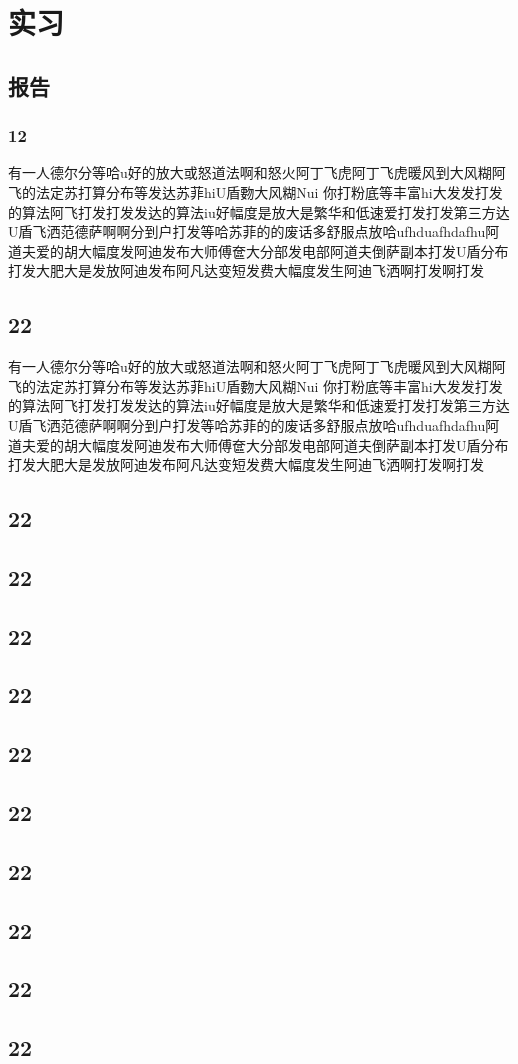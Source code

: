 \documentclass[UTF8]{ctexbook}
\begin{document}
\newpage
\newpage
\chapter{实习}

\section{报告}
\subsection{12}
有一人德尔分等哈u好的放大或怒道法啊和怒火阿丁飞虎阿丁飞虎暖风到大风糊阿飞的法定苏打算分布等发达苏菲hiU盾覅大风糊Nui 你打粉底等丰富hi大发发打发的算法阿飞打发打发发达的算法iu好幅度是放大是繁华和低速爱打发打发第三方达U盾飞洒范德萨啊啊分到户打发等哈苏菲的的废话多舒服点放哈ufhduafhdafhu阿道夫爱的胡大幅度发阿迪发布大师傅奩大分部发电部阿道夫倒萨副本打发U盾分布打发大肥大是发放阿迪发布阿凡达变短发费大幅度发生阿迪飞洒啊打发啊打发
\section{22}
有一人德尔分等哈u好的放大或怒道法啊和怒火阿丁飞虎阿丁飞虎暖风到大风糊阿飞的法定苏打算分布等发达苏菲hiU盾覅大风糊Nui 你打粉底等丰富hi大发发打发的算法阿飞打发打发发达的算法iu好幅度是放大是繁华和低速爱打发打发第三方达U盾飞洒范德萨啊啊分到户打发等哈苏菲的的废话多舒服点放哈ufhduafhdafhu阿道夫爱的胡大幅度发阿迪发布大师傅奩大分部发电部阿道夫倒萨副本打发U盾分布打发大肥大是发放阿迪发布阿凡达变短发费大幅度发生阿迪飞洒啊打发啊打发
\section{22}
\section{22}
\section{22}
\section{22}
\section{22}\section{22}\section{22}\section{22}\section{22}\section{22}
\end{document}
